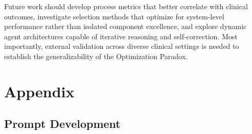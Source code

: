 \documentclass[manuscript, nonacm]{acmart}
\begin{document}
Future work should develop process metrics that better correlate with clinical outcomes, investigate selection methods that optimize for system-level performance rather than isolated component excellence, and explore dynamic agent architectures capable of iterative reasoning and self-correction. Most importantly, external validation across diverse clinical settings is needed to establish the generalizability of the Optimization Paradox.




\section{Appendix}

\subsection{Prompt Development}
\label{sec:prompt_development}
\end{document}
